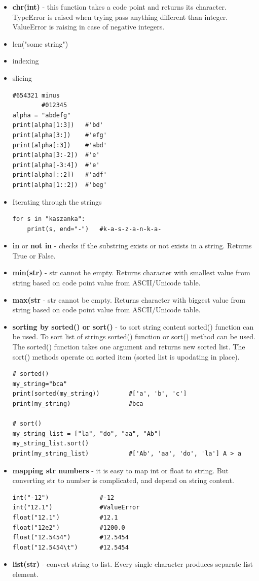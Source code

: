 \documentclass{article}
\begin{document}
\begin{itemize}
\item \textbf{chr(int)} - this function takes a code point and returns its character. \textcolor{pythonerror}{TypeError} is raised when trying pass anything different than integer. \textcolor{pythonerror}{ValueError} is raising in case of negative integers.
\item len("some string")
\item indexing
\item slicing
\begin{lstlisting}[style=pystyle]
        #654321 minus
        #012345
alpha = "abdefg"
print(alpha[1:3])   #'bd'
print(alpha[3:])    #'efg'
print(alpha[:3])    #'abd'
print(alpha[3:-2])  #'e'
print(alpha[-3:4])  #'e'
print(alpha[::2])   #'adf'
print(alpha[1::2])  #'beg'
\end{lstlisting}
\item Iterating through the strings
\begin{lstlisting}[style=pystyle]
for s in "kaszanka":
    print(s, end="-")	#k-a-s-z-a-n-k-a-
\end{lstlisting}
\item \textbf{in} or \textbf{not in} - checks if the substring exists or not exists in a string. Returns True or False.
\item \textbf{min(str)} - str cannot be empty. Returns character with smallest value from string based on code point value from ASCII/Unicode table.
\item \textbf{max(str} - str cannot be empty. Returns character with biggest value from string based on code point value from ASCII/Unicode table.
\item \textbf{sorting by sorted() or sort()} - to sort string content sorted() function can be used. To sort list of strings sorted() function or sort() method can be used. The sorted() function takes one argument and returns new sorted list. The sort() methods operate on sorted item (sorted list is upodating in place).
\begin{lstlisting}[style=pystyle]
# sorted()
my_string="bca"
print(sorted(my_string))		#['a', 'b', 'c']
print(my_string)				#bca

# sort()
my_string_list = ["la", "do", "aa", "Ab"]
my_string_list.sort()
print(my_string_list)			#['Ab', 'aa', 'do', 'la'] A > a
\end{lstlisting}
\item \textbf{mapping str numbers} - it is easy to map int or float to string. But converting str to number is complicated, and depend on string content.
\begin{lstlisting}[style=pystyle]
int("-12")				#-12
int("12.1")				#ValueError
float("12.1")			#12.1
float("12e2")			#1200.0
float("12.5454")		#12.5454
float("12.5454\t")		#12.5454
\end{lstlisting}
\item \textbf{list(str)} - convert string to list. Every single character produces separate list element.
\end{itemize}
\end{document}
